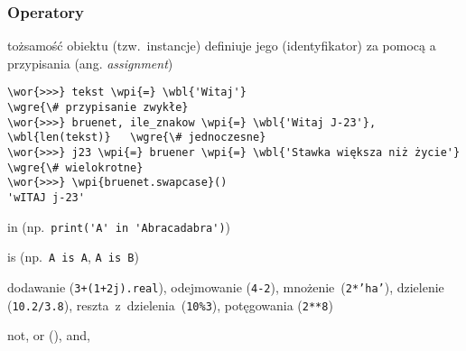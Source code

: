 \begin{frame}[fragile]
\frametitle{Operatory}

\begin{description}\scriptsize

 \item[przypisania] tożsamość obiektu (tzw.\ instancje) definiuje
 jego  (identyfikator) za pomocą a
 przypisania \wpi{\tb{=}} (ang. \emph{assignment})

\end{description}
\begin{Verbatim}[fontsize=\scriptsize,codes={\catcode`$=3\catcode`^=7},
                 frame=single,framesep=3mm,commandchars=\\\{\}]
\wor{>>>} tekst \wpi{=} \wbl{'Witaj'}                                  \wgre{\# przypisanie zwykłe}
\wor{>>>} bruenet, ile_znakow \wpi{=} \wbl{'Witaj J-23'}, \wbl{len(tekst)}   \wgre{\# jednoczesne}
\wor{>>>} j23 \wpi{=} bruener \wpi{=} \wbl{'Stawka większa niż życie'}       \wgre{\# wielokrotne}
\wor{>>>} \wpi{bruenet.swapcase}()
'wITAJ j-23'
\end{Verbatim}
\begin{description}\scriptsize
 \item[zawierania] in (np.\ \verb+print('A' in 'Abracadabra')+)
 \item[tożsamości] is (np.\ \verb+A is A+, \verb+A is B+)

 \item[matematyczne] dodawanie (\verb|3+(1+2j).real|), odejmowanie
 (\verb+4-2+), \mbox{mnożenie (\texttt{2*'ha'})}, dzielenie
 (\verb+10.2/3.8+), \mbox{reszta z dzielenia (\texttt{10\%3})}, potęgowania
 (\verb+2**8+)

\item[logiczne] not, or (), and, 
\end{description}
\end{frame}


